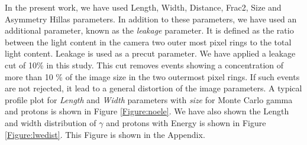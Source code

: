 \documentclass[preprint,12pt]{elsarticle}
\begin{document}
In the present work, we have used Length, Width, Distance, Frac2, 
Size and Asymmetry Hillas parameters. In addition to these parameters, we have 
used an additional parameter, known as the {\it leakage} parameter. It is defined as the 
ratio between the light content in the camera two outer most pixel rings to the total light content.
Leakage is used as a precut parameter. We have applied a leakage cut of 10\% in this study. This cut  
removes events showing a concentration of more than 10 \% of the image size in the two outermost pixel rings. 
If such events are not rejected, it lead to a general distortion of the image parameters. A typical profile plot for 
{\it Length} and {\it Width} parameters with {\it size} for Monte Carlo gamma and protons is shown in Figure 
\ref{Figure:noele}. 
We have also shown the Length and width distribution of $\gamma$ and protons with 
Energy is shown in Figure \ref{Figure:lwedist}. This Figure is shown in the Appendix.








%

\end{document}
